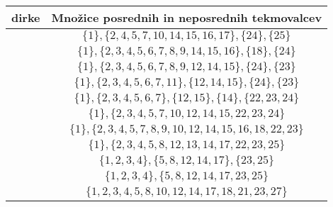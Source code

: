 \documentclass[a4paper, 12pt]{book}
\begin{document}

\begin{table}
\begin{center}
    \begin{tabular}{ |c|c| } 
        \hline
            dirke & Množice posrednih in neposrednih tekmovalcev \\ 
        \hline
            [1,3] & $\{1\}, \{2, 4, 5, 7, 10, 14, 15, 16, 17\}, \{24\}, \{25\}$ \\ 
        \hline
            [2,4] & $\{1\}, \{2, 3, 4, 5, 6, 7, 8, 9, 14, 15, 16\}, \{18\}, \{24\}$ \\ 
        \hline
            [3,5] & $\{1\}, \{2, 3, 4, 5, 6, 7, 8, 9, 12, 14, 15\}, \{24\}, \{23\}$ \\ 
        \hline
            [4,6] & $\{1\}, \{2, 3, 4, 5, 6, 7, 11\}, \{12, 14, 15\}, \{24\}, \{23\}$ \\ 
        \hline
            [5,7] & $\{1\}, \{2, 3, 4, 5, 6, 7\}, \{12, 15\}, \{14\}, \{22, 23, 24\}$ \\ 
        \hline
            [6,8] & $\{1\}, \{2, 3, 4, 5, 7, 10, 12, 14, 15, 22, 23, 24\}$ \\ 
        \hline
            [7,9] & $\{1\}, \{2, 3, 4, 5, 7, 8, 9, 10, 12, 14, 15, 16, 18, 22, 23\}$ \\ 
        \hline
            [8,10] & $\{1\}, \{2, 3, 4, 5, 8, 12, 13, 14, 17, 22, 23, 25\}$ \\ 
        \hline
            [9,11] & $\{1, 2, 3, 4\}, \{5, 8, 12, 14, 17\}, \{23, 25\}$ \\ 
        \hline
            [10,12] & $\{1, 2, 3, 4\}, \{5, 8, 12, 14, 17, 23, 25\}$ \\ 
        \hline
            [11,13] & $\{1, 2, 3, 4, 5, 8, 10, 12, 14, 17, 18, 21, 23, 27\}$ \\ 

\end{tabular}
\end{center}
\end{table}
\end{document}

